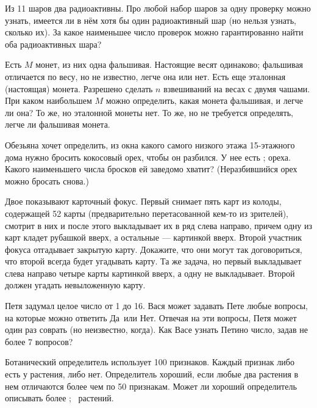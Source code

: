 \documentclass[a4paper,12pt]{article}
\begin{document}
Из 11 шаров два радиоактивны. Про любой набор шаров за одну проверку
можно узнать, имеется ли в нём хотя бы один радиоактивный шар (но
нельзя узнать, сколько их).
За какое наименьшее число проверок
можно гарантированно найти оба радиоактивных шара?

 Есть $M$ монет, из них одна фальшивая. Настоящие весят
одинаково; фальшивая отличается по весу, но не известно,
легче она или нет. Есть еще эталонная (настоящая) монета.
Разрешено сделать $n$ взвешиваний на
весах с двумя чашами. При каком наибольшем $M$ можно определить, какая
монета фальшивая, и легче ли она?
 То же, но эталонной монеты нет.
 То же, но не требуется определять, легче ли фальшивая монета.

Обезьяна хочет определить, из окна какого самого низкого этажа
15-этажного дома нужно бросить кокосовый орех, чтобы он разбился.
У нее есть
;
 ореха.
Какого наименьшего числа бросков ей заведомо хватит?
(Неразбившийся орех можно бросать снова.)


Двое показывают карточный фокус.  Первый  снимает
пять карт из колоды, содержащей 52 карты (предварительно перетасованной
кем-то из зрителей), смотрит в них и после этого выкладывает
их в ряд слева направо, причем одну из карт кладет рубашкой
вверх, а остальные --- картинкой вверх. Второй участник фокуса
отгадывает закрытую карту. Докажите, что они могут  так  договориться,
что второй всегда будет угадывать карту.
Та же задача, но первый выкладывает слева направо четыре карты картинкой
вверх, а одну не выкладывает. Второй должен угадать невыложенную карту.

Петя задумал целое число от 1 до 16. Вася может задавать Пете любые
вопросы, на которые можно ответить  Да\ или  Нет.
Отвечая на эти вопросы, Петя может один раз соврать
(но неизвестно, когда).
Как Васе узнать Петино число, задав не более 7 вопросов?


Ботанический определитель использует 100 признаков.
Каждый признак либо есть у растения, либо нет.
Определитель  хороший, если любые два растения в нем отличаются
более чем по 50 признакам. Может ли хороший определитель
описывать более
;
~растений.





\vspace*{-4mm}



\end{document}
